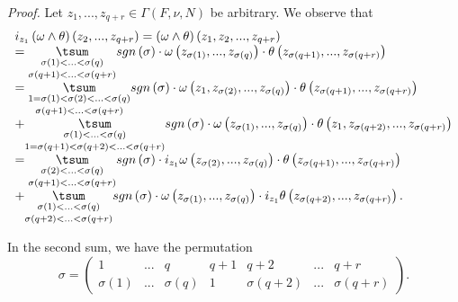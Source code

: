 \documentclass[11pt]{article}
\begin{document}
\emph{Proof. }Let $z_{1},...,z_{q+r}\in \Gamma \left( F,\nu ,N\right) $ be
arbitrary. We observe that
\begin{equation*}
\begin{array}{l}
i_{z_{1}}\left( \omega \wedge \theta \right) \left( z_{2},...,z_{q+r}\right)
=\left( \omega \wedge \theta \right) \left( z_{1},z_{2},...,z_{q+r}\right)
\\
=\underset{\sigma \left( q+1\right) <...<\sigma \left( q+r\right) }{\underset%
{\sigma \left( 1\right) <...<\sigma \left( q\right) }{\tsum }}sgn\left(
\sigma \right) \cdot \omega \left( z_{\sigma \left( 1\right) },...,z_{\sigma
\left( q\right) }\right) \cdot \theta \left( z_{\sigma \left( q+1\right)
},...,z_{\sigma \left( q+r\right) }\right) \\
=\underset{\sigma \left( q+1\right) <...<\sigma \left( q+r\right) }{\underset%
{1=\sigma \left( 1\right) <\sigma \left( 2\right) <...<\sigma \left(
q\right) }{\tsum }}sgn\left( \sigma \right) \cdot \omega \left(
z_{1},z_{\sigma \left( 2\right) },...,z_{\sigma \left( q\right) }\right)
\cdot \theta \left( z_{\sigma \left( q+1\right) },...,z_{\sigma \left(
q+r\right) }\right) \\
+\underset{1=\sigma \left( q+1\right) <\sigma \left( q+2\right) <...<\sigma
\left( q+r\right) }{\underset{\sigma \left( 1\right) <...<\sigma \left(
q\right) }{\tsum }}sgn\left( \sigma \right) \cdot \omega \left( z_{\sigma
\left( 1\right) },...,z_{\sigma \left( q\right) }\right) \cdot \theta \left(
z_{1},z_{\sigma \left( q+2\right) },...,z_{\sigma \left( q+r\right) }\right)
\\
=\underset{\sigma \left( q+1\right) <...<\sigma \left( q+r\right) }{\underset%
{\sigma \left( 2\right) <...<\sigma \left( q\right) }{\tsum }}sgn\left(
\sigma \right) \cdot i_{z_{1}}\omega \left( z_{\sigma \left( 2\right)
},...,z_{\sigma \left( q\right) }\right) \cdot \theta \left( z_{\sigma
\left( q+1\right) },...,z_{\sigma \left( q+r\right) }\right) \\
+\underset{\sigma \left( q+2\right) <...<\sigma \left( q+r\right) }{\underset%
{\sigma \left( 1\right) <...<\sigma \left( q\right) }{\tsum }}sgn\left(
\sigma \right) \cdot \omega \left( z_{\sigma \left( 1\right) },...,z_{\sigma
\left( q\right) }\right) \cdot i_{z_{1}}\theta \left( z_{\sigma \left(
q+2\right) },...,z_{\sigma \left( q+r\right) }\right) .%
\end{array}%
\end{equation*}

In the second sum, we have the permutation%
\begin{equation*}
\sigma =\left(
\begin{array}{ccccccc}
1 & ... & q & q+1 & q+2 & ... & q+r \\
\sigma \left( 1\right) & ... & \sigma \left( q\right) & 1 & \sigma \left(
q+2\right) & ... & \sigma \left( q+r\right)%
\end{array}%
\right) .
\end{equation*}
\end{document}
